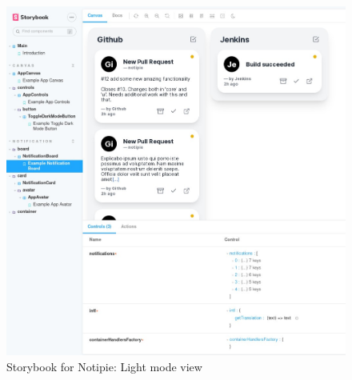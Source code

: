 \begin{figure}[p]
  \centering
  \includegraphics[width=\linewidth,keepaspectratio]{img/storybook_light.jpg}
  \caption{Storybook for Notipie: Light mode view}
  \label{fig:storybook-light}
\end{figure}
